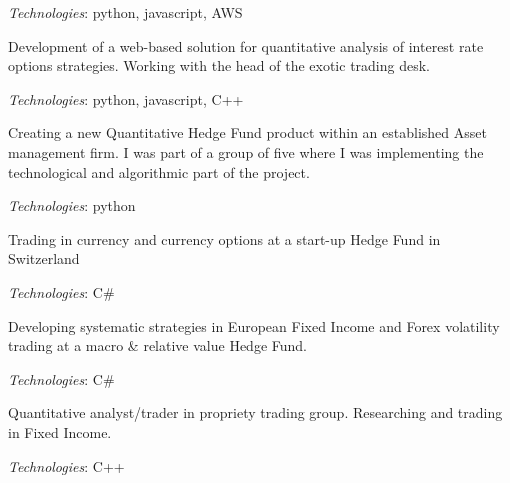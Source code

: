 {\it Technologies}: python, javascript, AWS


Development of a web-based solution for quantitative analysis of interest rate options strategies.
Working with the head of the exotic trading desk.

{\it Technologies}: python, javascript, C++


Creating a new Quantitative Hedge Fund product within an established Asset management firm.
I was part of a group of five where I was implementing the technological and algorithmic part of the project.

{\it Technologies}: python


Trading in currency and currency options at a start-up Hedge Fund in Switzerland

{\it Technologies}: C\#


Developing systematic strategies in European Fixed Income and Forex volatility trading at a macro \& relative value Hedge Fund.

{\it Technologies}: C\#


Quantitative analyst/trader in propriety trading group. Researching and trading in Fixed Income.

{\it Technologies}: C++
